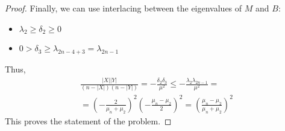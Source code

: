 \begin{problem}
\begin{sol}
\begin{proof}
            Finally, we can use interlacing between the eigenvalues of $M$ and $B$:
            \begin{itemize}
                \item $\lambda_2 \geq \delta_2 \geq 0$
                \item $0 > \delta_3 \geq \lambda_{2n-4+3} = \lambda_{2n-1}$
            \end{itemize}
            Thus,
            \[
                \begin{gathered}
                    \frac{|X| |Y|}{(n - |X|)(n - |Y|)} = -\frac{\delta_2 \delta_3}{\mu^2} \leq -\frac{\lambda_2 \lambda_{2n -1}}{\mu^2} = \\
                    = \left(-\frac{2}{\mu_n + \mu_2}\right)^2 \left(-\frac{\mu_n - \mu_2}{2}\right)^2 = \left(\frac{\mu_n - \mu_2}{\mu_n + \mu_2}\right)^2
                \end{gathered}
            \]
            This proves the statement of the problem.

        \end{proof}
    \end{sol}
\end{problem}
